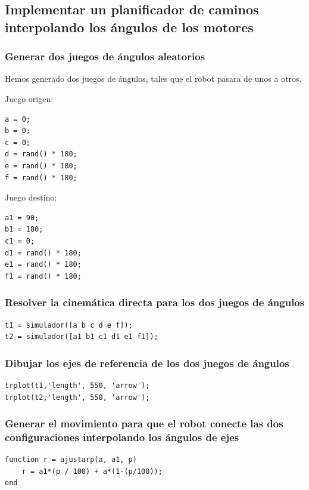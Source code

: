 \documentclass{article}
\begin{document}
\subsection{Implementar un planificador de caminos interpolando los ángulos de los motores}

\subsubsection{Generar dos juegos de ángulos aleatorios}
Hemos generado dos juegos de ángulos, tales que el robot pasara de unos a otros.

Juego origen:
\begin{lstlisting}[frame=single]
a = 0;
b = 0;
c = 0;
d = rand() * 180;
e = rand() * 180;
f = rand() * 180;
\end{lstlisting}

Juego destino:
\begin{lstlisting}[frame=single]
a1 = 90;
b1 = 180;
c1 = 0;
d1 = rand() * 180;
e1 = rand() * 180;
f1 = rand() * 180;
\end{lstlisting}

\subsubsection{Resolver la cinemática directa para los dos juegos de ángulos}
\begin{lstlisting}[frame=single]
t1 = simulador([a b c d e f]);
t2 = simulador([a1 b1 c1 d1 e1 f1]);
\end{lstlisting}

\subsubsection{Dibujar los ejes de referencia de los dos juegos de ángulos}
\begin{lstlisting}[frame=single]
trplot(t1,'length', 550, 'arrow');
trplot(t2,'length', 550, 'arrow');
\end{lstlisting}

\subsubsection{Generar el movimiento para que el robot conecte las dos configuraciones interpolando los ángulos de ejes}
\begin{lstlisting}[frame=single]
function r = ajustarp(a, a1, p)
   	r = a1*(p / 100) + a*(1-(p/100));
end
\end{lstlisting}
\end{document}
